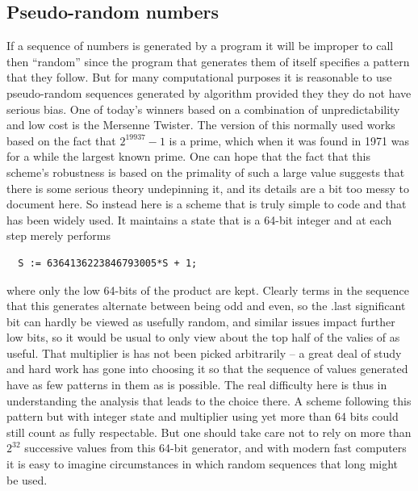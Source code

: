 \subsection{Pseudo-random numbers}
If a sequence of numbers is generated by a program it will be improper
to call then ``random'' since the program that generates them of itself
specifies a pattern that they follow. But for many computational purposes
it is reasonable to use pseudo-random sequences generated by algorithm
provided they they do not have serious bias. One of today's winners based
on a combination of unpredictability and low cost is the Mersenne
Twister\cite{merseenetwister}. The version of this normally used works
based on the fact that $2^{19937}-1$ is a prime, which when it was
found in 1971 was for a while the largest known prime. One can hope that
the fact that this scheme's robustness is based on the primality
of such a large value suggests that there is some serious theory undepinning
it, and its details are a bit too messy to document here. So instead
here is a scheme that is truly simple to code and that has been widely used.
It maintains a state \verb@S@ that is a 64-bit integer and at each
step merely performs
\begin{verbatim}
  S := 6364136223846793005*S + 1;
\end{verbatim}
where only the low 64-bits of the product are kept. Clearly terms in the
sequence that this generates alternate between being odd and even, so the
.last significant bit can hardly be viewed as usefully random, and similar
issues impact further low bits, so it would be usual to only view about the
top half of the valies of \verb@S@ as useful. That multiplier is has not
been picked arbitrarily -- a great deal of study and hard work has gone into
choosing it so that the sequence of values generated have as few patterns in
them as is possible. The real difficulty here is thus in understanding
the analysis that leads to the choice there. A scheme following this
pattern but with integer state and multiplier using yet more than 64 bits
could still count as fully respectable. But one should take care not to
rely on more than $2^32$ successive values from this 64-bit generator, and
with modern fast computers it is easy to imagine circumstances in which
random sequences that long might be used.
